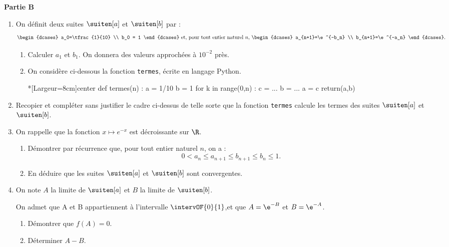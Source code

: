 \textbf{\large Partie B}
%
\begin{enumerate}
	\item On définit deux suites $\suiten[a]$ et $\suiten[b]$ par : \[ \begin{dcases} a_0=\tfrac{1}{10} \\ b_0 = 1 \end{dcases} \text{ et, pour tout entier naturel }n \text{, } \begin{dcases} a_{n+1}=\e^{-b_n} \\ b_{n+1}=\e^{-a_n} \end{dcases}. \]
	\begin{enumerate}
		\item Calculer $a_1$ et $b_1$. On donnera des valeurs approchées à $10^{-2}$ près.
		\item On considère ci-dessous la fonction \texttt{termes}, écrite en langage \textsf{Python}.
		
\begin{CodePythonLstAlt}*[Largeur=8cm]{center}
def termes(n) :
	a = 1/10
	b = 1
	for k in range(0,n) :
		c = ...
		b = ...
		a = c
	return(a,b)
\end{CodePythonLstAlt}
	\end{enumerate}
	\item Recopier et compléter sans justifier le cadre ci-dessus de telle sorte que la fonction \texttt{termes} calcule les termes des suites $\suiten[a]$ et $\suiten[b]$.
	\item On rappelle que la fonction $x \mapsto e^{-x}$ est décroissante sur $\R$.
	\begin{enumerate}
		\item Démontrer par récurrence que, pour tout entier naturel $n$, on a : \[ 0 < a_n \leqslant a_{n+1} \leqslant b_{n+1} \leqslant b_n \leqslant 1. \]%
		\item En déduire que les suites $\suiten[a]$ et $\suiten[b]$ sont convergentes.
	\end{enumerate}
	\item On note $A$ la limite de $\suiten[a]$ et $B$ la limite de $\suiten[b]$.
	
	On admet que A et B appartiennent à l'intervalle $\intervOF{0}{1}$,et que $A=\e^{-B}$ et $B=\e^{-A}$.
	\begin{enumerate}
		\item Démontrer que $f(A) =0$.
		\item Déterminer $A - B$.
	\end{enumerate}
\end{enumerate}